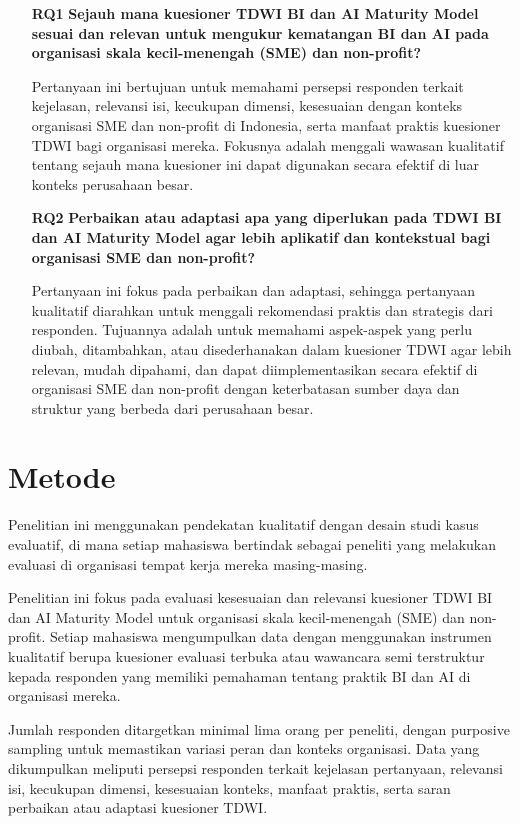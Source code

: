\documentclass{article}
\begin{document}
	\begin{enumerate}
		\item[\textbf{RQ1}] \textbf{Sejauh mana kuesioner TDWI BI dan AI Maturity Model sesuai dan relevan untuk mengukur kematangan BI dan AI pada organisasi skala kecil-menengah (SME) dan non-profit?}
		
		Pertanyaan ini bertujuan untuk memahami persepsi responden terkait kejelasan, relevansi isi, kecukupan dimensi, kesesuaian dengan konteks organisasi SME dan non-profit di Indonesia, serta manfaat praktis kuesioner TDWI bagi organisasi mereka. Fokusnya adalah menggali wawasan kualitatif tentang sejauh mana kuesioner ini dapat digunakan secara efektif di luar konteks perusahaan besar.
		
		\item[\textbf{RQ2}] \textbf{Perbaikan atau adaptasi apa yang diperlukan pada TDWI BI dan AI Maturity Model agar lebih aplikatif dan kontekstual bagi organisasi SME dan non-profit?}
		
		Pertanyaan ini fokus pada perbaikan dan adaptasi, sehingga pertanyaan kualitatif diarahkan untuk menggali rekomendasi praktis dan strategis dari responden. Tujuannya adalah untuk memahami aspek-aspek yang perlu diubah, ditambahkan, atau disederhanakan dalam kuesioner TDWI agar lebih relevan, mudah dipahami, dan dapat diimplementasikan secara efektif di organisasi SME dan non-profit dengan keterbatasan sumber daya dan struktur yang berbeda dari perusahaan besar.
	\end{enumerate}
	

\section{Metode}
Penelitian ini menggunakan pendekatan kualitatif dengan desain studi kasus evaluatif, di mana setiap mahasiswa bertindak sebagai peneliti yang melakukan evaluasi di organisasi tempat kerja mereka masing-masing.

Penelitian ini fokus pada evaluasi kesesuaian dan relevansi kuesioner TDWI BI dan AI Maturity Model untuk organisasi skala kecil-menengah (SME) dan non-profit. Setiap mahasiswa mengumpulkan data dengan menggunakan instrumen kualitatif berupa kuesioner evaluasi terbuka atau wawancara semi terstruktur kepada responden yang memiliki pemahaman tentang praktik BI dan AI di organisasi mereka.

Jumlah responden ditargetkan minimal lima orang per peneliti, dengan purposive sampling untuk memastikan variasi peran dan konteks organisasi. Data yang dikumpulkan meliputi persepsi responden terkait kejelasan pertanyaan, relevansi isi, kecukupan dimensi, kesesuaian konteks, manfaat praktis, serta saran perbaikan atau adaptasi kuesioner TDWI.
\end{document}
